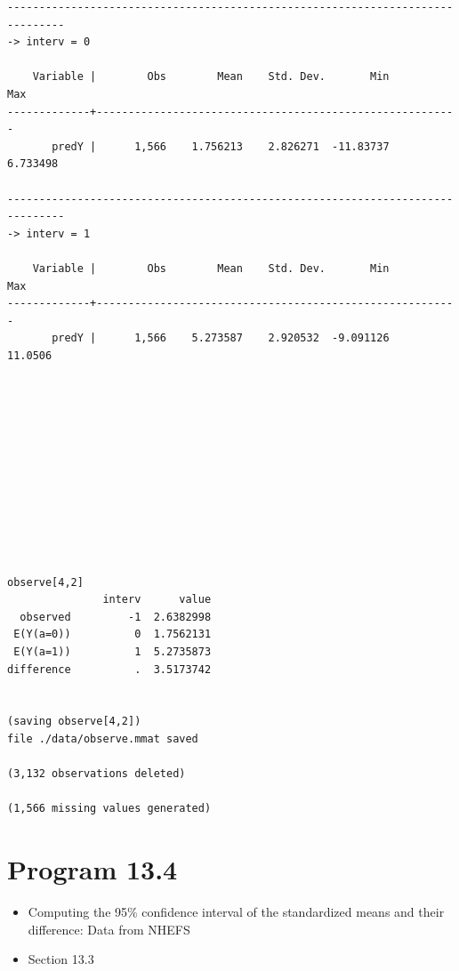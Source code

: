 \documentclass[
  10pt,
]{book}
\providecommand{\tightlist}{%
  \setlength{\itemsep}{0pt}\setlength{\parskip}{0pt}}
\begin{document}
\begin{verbatim}
-------------------------------------------------------------------------------
-> interv = 0

    Variable |        Obs        Mean    Std. Dev.       Min        Max
-------------+---------------------------------------------------------
       predY |      1,566    1.756213    2.826271  -11.83737   6.733498

-------------------------------------------------------------------------------
-> interv = 1

    Variable |        Obs        Mean    Std. Dev.       Min        Max
-------------+---------------------------------------------------------
       predY |      1,566    5.273587    2.920532  -9.091126    11.0506












observe[4,2]
               interv      value
  observed         -1  2.6382998
 E(Y(a=0))          0  1.7562131
 E(Y(a=1))          1  5.2735873
difference          .  3.5173742


(saving observe[4,2])
file ./data/observe.mmat saved

(3,132 observations deleted)

(1,566 missing values generated)
\end{verbatim}

\hypertarget{program-13.4-1}{%
\section{Program 13.4}\label{program-13.4-1}}

\begin{itemize}
\tightlist
\item
  Computing the 95\% confidence interval of the standardized means and their difference: Data from NHEFS
\item
  Section 13.3
\end{itemize}
\end{document}
